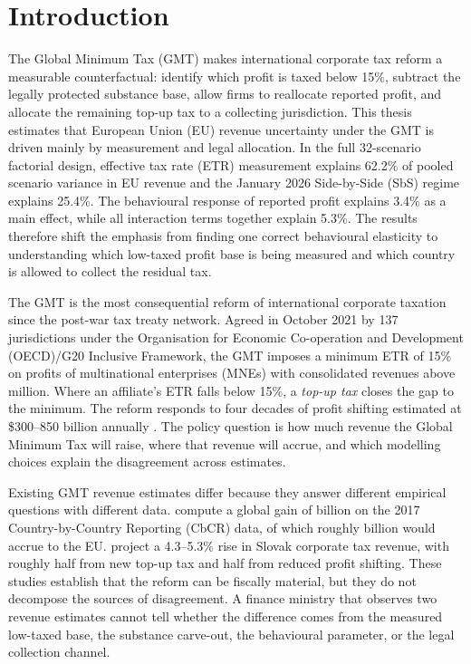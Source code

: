 \documentclass[11pt,a4paper]{article}
\newcommand{\EUR}{\texteuro}
\begin{document}
\newpage

\section{Introduction}\label{sec:introduction}

The Global Minimum Tax (GMT) makes international corporate tax reform a measurable counterfactual: identify which profit is taxed below 15\%, subtract the legally protected substance base, allow firms to reallocate reported profit, and allocate the remaining top-up tax to a collecting jurisdiction. This thesis estimates that European Union (EU) revenue uncertainty under the GMT is driven mainly by measurement and legal allocation. In the full 32-scenario factorial design, effective tax rate (ETR) measurement explains 62.2\% of pooled scenario variance in EU revenue and the January 2026 Side-by-Side (SbS) regime explains 25.4\%. The behavioural response of reported profit explains 3.4\% as a main effect, while all interaction terms together explain 5.3\%. The results therefore shift the emphasis from finding one correct behavioural elasticity to understanding which low-taxed profit base is being measured and which country is allowed to collect the residual tax.

The GMT is the most consequential reform of international corporate taxation since the post-war tax treaty network. Agreed in October 2021 by 137 jurisdictions under the Organisation for Economic Co-operation and Development (OECD)/G20 Inclusive Framework, the GMT imposes a minimum ETR of 15\% on profits of multinational enterprises (MNEs) with consolidated revenues above \EUR750 million. Where an affiliate's ETR falls below 15\%, a \emph{top-up tax} closes the gap to the minimum. The reform responds to four decades of profit shifting estimated at \$300--850 billion annually \citep{torslov2023,garcia-bernardo2024,blouin2023,cobham2018}. The policy question is how much revenue the Global Minimum Tax will raise, where that revenue will accrue, and which modelling choices explain the disagreement across estimates.

Existing GMT revenue estimates differ because they answer different empirical questions with different data. \citet{barake2022} compute a global gain of \EUR179 billion on the 2017 Country-by-Country Reporting (CbCR) data, of which roughly \EUR55 billion would accrue to the EU. \citet{boukal2026} project a 4.3--5.3\% rise in Slovak corporate tax revenue, with roughly half from new top-up tax and half from reduced profit shifting. These studies establish that the reform can be fiscally material, but they do not decompose the sources of disagreement. A finance ministry that observes two revenue estimates cannot tell whether the difference comes from the measured low-taxed base, the substance carve-out, the behavioural parameter, or the legal collection channel.
\end{document}
